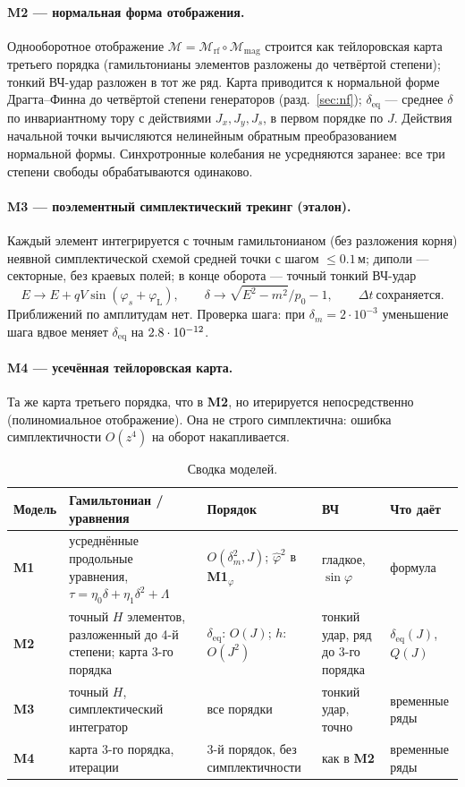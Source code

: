 \documentclass[a4paper,11pt]{article}
\newcommand{\deq}{\delta_{\mathrm{eq}}}
\newcommand{\rf}{\mathrm{rf}}
\newcommand{\Mone}{\textbf{M1}}\newcommand{\Mtwo}{\textbf{M2}}
\newcommand{\Mthree}{\textbf{M3}}\newcommand{\Mfour}{\textbf{M4}}
\begin{document}
\paragraph{\Mtwo{} --- нормальная форма отображения.}
Однооборотное отображение $\mathcal M=\mathcal M_\rf\circ\mathcal M_{\mathrm{mag}}$ строится как тейлоровская карта третьего порядка (гамильтонианы элементов разложены до четвёртой степени); тонкий ВЧ-удар разложен в тот же ряд. Карта приводится к нормальной форме Драгта--Финна до четвёртой степени генераторов (разд.~\ref{sec:nf}); $\deq$ --- среднее $\delta$ по инвариантному тору с действиями $J_x,J_y,J_s$, в первом порядке по $J$. Действия начальной точки вычисляются нелинейным обратным преобразованием нормальной формы. Синхротронные колебания не усредняются заранее: все три степени свободы обрабатываются одинаково.

\paragraph{\Mthree{} --- поэлементный симплектический трекинг (эталон).}
Каждый элемент интегрируется с точным гамильтонианом (без разложения корня) неявной симплектической схемой средней точки с шагом $\le0.1$\,м; диполи --- секторные, без краевых полей; в конце оборота --- точный тонкий ВЧ-удар
\[
E\to E+qV\sin(\varphi_s+\varphi_{\mathrm{L}}),\qquad \delta\to\sqrt{E^2-m^2}/p_0-1,\qquad \Delta t\ \text{сохраняется}.
\]
Приближений по амплитудам нет. Проверка шага: при $\delta_m=2\cdot10^{-3}$ уменьшение шага вдвое меняет $\deq$ на $2.8\cdot10^{-12}$.

\paragraph{\Mfour{} --- усечённая тейлоровская карта.}
Та же карта третьего порядка, что в \Mtwo, но итерируется непосредственно (полиномиальное отображение). Она не строго симплектична: ошибка симплектичности $O(z^4)$ на оборот накапливается.

\begin{table}[H]\centering\small
\caption{Сводка моделей.}
\begin{tabular}{p{1.0cm}p{4.2cm}p{3.2cm}p{2.9cm}p{2.3cm}}
\toprule
Модель & Гамильтониан / уравнения & Порядок & ВЧ & Что даёт \\
\midrule
\Mone & усреднённые продольные уравнения, $\tau=\eta_0\delta+\eta_1\delta^2+\Lambda$ & $O(\delta_m^2,J)$; $\hat\varphi^2$ в \Mone$_\varphi$ & гладкое, $\sin\varphi$ & формула \\
\Mtwo & точный $H$ элементов, разложенный до 4-й степени; карта 3-го порядка & $\deq$: $O(J)$; $h$: $O(J^2)$ & тонкий удар, ряд до 3-го порядка & $\deq(J)$, $Q(J)$ \\
\Mthree & точный $H$, симплектический интегратор & все порядки & тонкий удар, точно & временные ряды \\
\Mfour & карта 3-го порядка, итерации & 3-й порядок, без симплектичности & как в \Mtwo & временные ряды \\
\bottomrule
\end{tabular}
\end{table}
\end{document}
